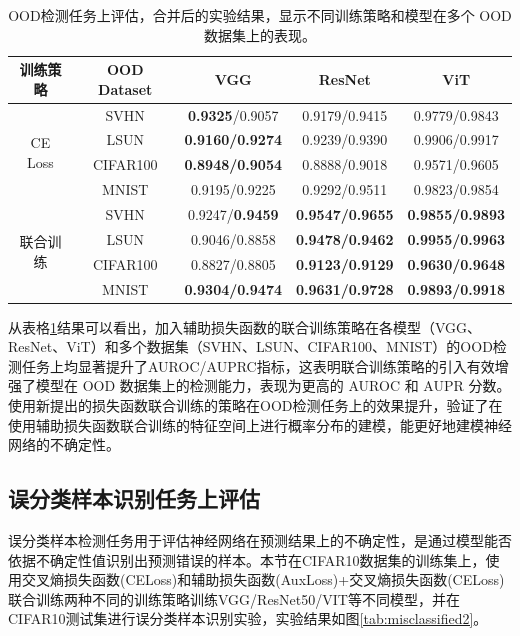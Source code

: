 \begin{table}[h]
\captionsetup{font=small, justification=centering}
\centering
\renewcommand{\arraystretch}{1.2}
\setlength{\tabcolsep}{8pt}
\begin{tabular}{c c c c c}
\hline
\textbf{训练策略} & \textbf{OOD Dataset} & \textbf{VGG} & \textbf{ResNet} & \textbf{ViT} \\ 
\hline
\multirow{4}{*}{CE Loss} 
& SVHN & \textbf{0.9325}/0.9057 & 0.9179/0.9415 & 0.9779/0.9843 \\ 
& LSUN & \textbf{0.9160/0.9274} & 0.9239/0.9390 & 0.9906/0.9917 \\ 
& CIFAR100 & \textbf{0.8948/0.9054} & 0.8888/0.9018 & 0.9571/0.9605 \\ 
& MNIST & 0.9195/0.9225 & 0.9292/0.9511 & 0.9823/0.9854 \\ 
\midrule
\multirow{4}{*}{联合训练} 
& SVHN & 0.9247/\textbf{0.9459} &\textbf{ 0.9547/0.9655} & \textbf{0.9855/0.9893} \\ 
& LSUN & 0.9046/0.8858 & \textbf{0.9478/0.9462} & \textbf{0.9955/0.9963 }\\ 
& CIFAR100 & 0.8827/0.8805 &\textbf{ 0.9123/0.9129} & \textbf{0.9630/0.9648 }\\ 
& MNIST & \textbf{0.9304/0.9474} & \textbf{0.9631/0.9728} & \textbf{0.9893/0.9918} \\ 
\hline
\end{tabular}
\caption{OOD检测任务上评估，合并后的实验结果，显示不同训练策略和模型在多个 OOD 数据集上的表现。}
\label{OOD}
\end{table}


从表格\ref{OOD}结果可以看出，加入辅助损失函数的联合训练策略在各模型（VGG、ResNet、ViT）和多个数据集（SVHN、LSUN、CIFAR100、MNIST）的OOD检测任务上均显著提升了AUROC/AUPRC指标，这表明联合训练策略的引入有效增强了模型在 OOD 数据集上的检测能力，表现为更高的 AUROC 和 AUPR 分数。使用新提出的损失函数联合训练的策略在OOD检测任务上的效果提升，验证了在使用辅助损失函数联合训练的特征空间上进行概率分布的建模，能更好地建模神经网络的不确定性。

\subsection{误分类样本识别任务上评估}

误分类样本检测任务用于评估神经网络在预测结果上的不确定性，是通过模型能否依据不确定性值识别出预测错误的样本。本节在CIFAR10数据集的训练集上，使用交叉熵损失函数(CELoss)和辅助损失函数(AuxLoss)+交叉熵损失函数(CELoss)联合训练两种不同的训练策略训练VGG/ResNet50/VIT等不同模型，并在CIFAR10测试集进行误分类样本识别实验，实验结果如图\ref{tab:misclassified2}。

